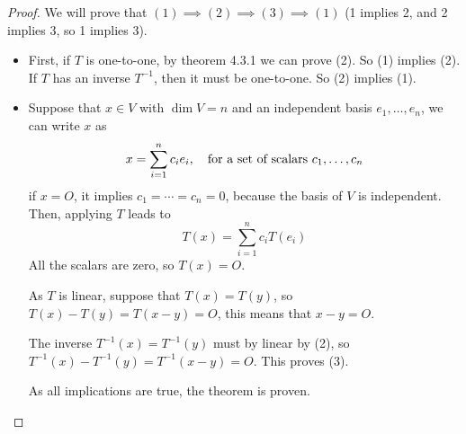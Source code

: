 \documentclass{book}
\begin{document}
\begin{proof}
    We will prove that $(1)\implies (2) \implies (3) \implies (1)$ (1 implies 2, and 2 implies 3, so 1 implies 3).

    \begin{itemize}
        \item First, if $T$ is one-to-one, by theorem 4.3.1 we can prove (2). So (1) implies
              (2). If $T$ has an inverse $T^{-1}$, then it must be one-to-one. So (2) implies
              (1).
        \item Suppose that $x\in V$ with $\dim V = n$ and an independent basis
              $e_1,\dots,e_n$, we can write $x$ as
              \begin{equation*}
                  x=\sum_{i=1}^{n}{c_i e_i}, \quad \textnormal{for a set of scalars }c_1,\dots,c_n
              \end{equation*}
              if $x=O$, it implies $c_1=\cdots=c_n=0$, because the basis of $V$ is independent. Then, applying $T$ leads to
              \begin{equation*}
                  T(x)=\sum_{i=1}^{n}{c_i T(e_i)}
              \end{equation*}
              All the scalars are zero, so $T(x) = O$.

              As $T$ is linear, suppose that $T(x) = T(y)$, so $T(x) - T(y)= T(x-y) = O$,
              this means that $x-y=O$.

              The inverse $T^{-1}(x) = T^{-1}(y)$ must by linear by (2), so $T^{-1}(x) -
                  T^{-1}(y) = T^{-1}(x-y)=O$. This proves (3).

              As all implications are true, the theorem is proven.
    \end{itemize}
\end{proof}
\end{document}
